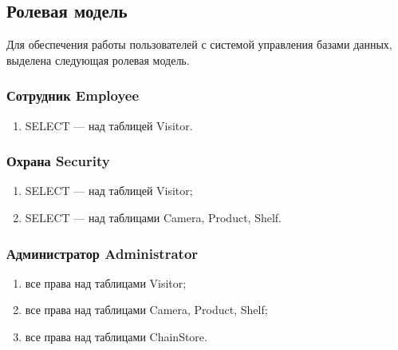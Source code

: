 

\subsection{Ролевая модель}

Для обеспечения работы пользователей с системой управления базами данных, выделена
следующая ролевая модель.

\subsubsection{Сотрудник Employee}

\begin{enumerate}[label=\arabic*.]
    \item SELECT --- над таблицей Visitor.
\end{enumerate}


\subsubsection{Охрана Security}

\begin{enumerate}[label=\arabic*.]
    \item SELECT --- над таблицей Visitor;
    \item SELECT --- над таблицами Camera, Product, Shelf.
\end{enumerate}


\subsubsection{Администратор Administrator}

\begin{enumerate}[label=\arabic*.]
    \item все права над таблицами Visitor;
    \item все права над таблицами Camera, Product, Shelf;
    \item все права над таблицами ChainStore.
\end{enumerate}


